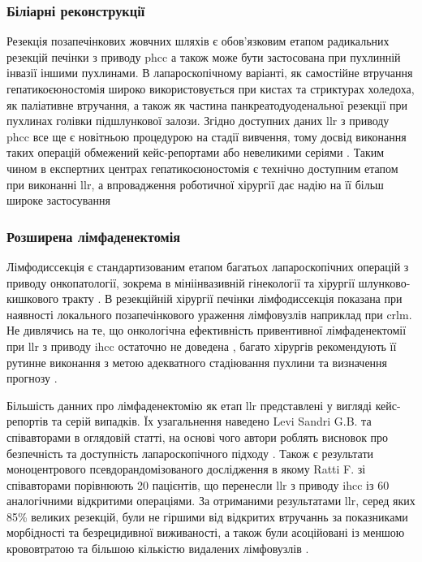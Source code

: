 \begin{refsection}
\subsubsection{Біліарні реконструкції}

Резекція позапечінкових жовчних шляхів є обов'язковим етапом радикальних резекцій печінки з приводу \acrshort{phcc} а також може бути застосована при пухлинній інвазії іншими пухлинами. В лапароскопічному варіанті, як самостійне втручання гепатикоєюностомія широко використовується при кистах та стриктурах холедоха, як паліативне втручання, а також як частина панкреатодуоденальної резекції при пухлинах голівки підшлункової залози. Згідно доступних даних \acrshort{llr} з приводу  \acrshort{phcc} все ще є новітньою процедурою на стадії вивчення, тому досвід виконання таких операцій обмежений кейс-репортами \cite{Lin2014, Machado2014} або невеликими серіями \cite{Ratti2020}. Таким чином в експертних центрах гепатикоєюностомія є технічно доступним етапом при виконанні \acrshort{llr}, а впровадження роботичної хірургії дає надію на її більш широке застосування \cite{Machado2019, Giulianotti2010}

\subsubsection{Розширена лімфаденектомія}

Лімфодиссекція є стандартизованим етапом багатьох лапароскопічних операцій з приводу онкопатології, зокрема в мініінвазивній гінекології та хірургії шлунково-кишкового тракту \cite{Eshuis2018, Jung2019}. В резекційній хірургії печінки лімфодиссекція показана при наявності локального позапечінкового ураження лімфовузлів наприклад при \acrshort{crlm}. Не дивлячись на те, що  онкологічна ефективність привентивної лімфаденектомії при \acrshort{llr} з приводу \acrshort{ihcc} остаточно не доведена \cite{Weber2015, Zhou2019a}, багато хірургів рекомендують її рутинне виконання з метою адекватного стадіювання пухлини та визначення прогнозу \cite{Waisberg2018, Ratti2020a}.

Більшість данних про лімфаденектомію як етап \acrshort{llr} представлені у вигляді кейс-репортів та серій випадків. Їх узагальнення  наведено Levi Sandri G.B. та співавторами в оглядовій статті, на основі чого автори роблять висновок про безпечність та доступність лапароскопічного підходу \cite{Colasanti2017}. Також є результати моноцентрового псевдорандомізованого дослідження в якому Ratti F. зі співавторами порівнюють 20 пацієнтів, що перенесли \acrshort{llr} з приводу \acrshort{ihcc} із 60 аналогічними відкритими операціями. За отриманими результатами \acrshort{llr}, серед яких 85\% великих резекцій, були не гіршими від відкритих втручаннь за показниками морбідності та безрецидивної виживаності, а також були асоційовані із меншою крововтратою та більшою кількістю видалених лімфовузлів \cite{Ratti2016a}. 


\end{refsection}
